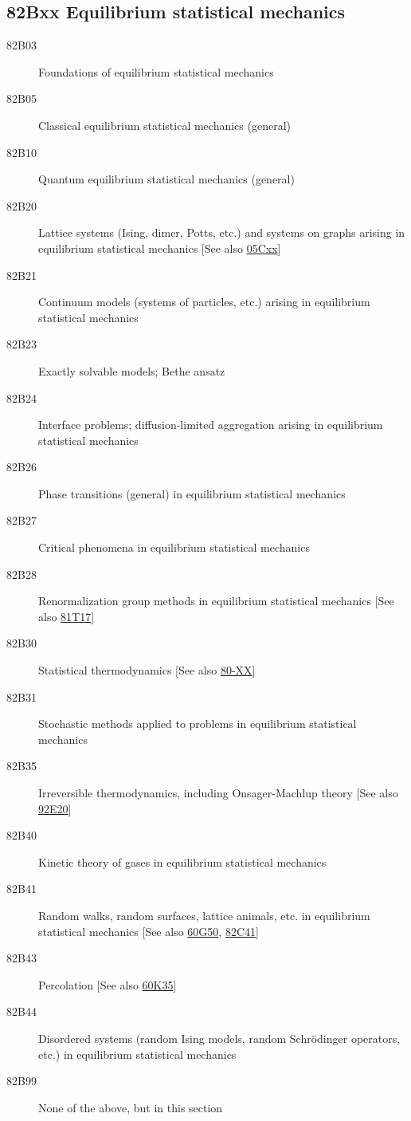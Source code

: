 \subsection*{82Bxx  Equilibrium statistical mechanics }\label{82Bxx}
\begin{description}  
\item [82B03]\label{82B03} Foundations of equilibrium statistical mechanics
\item [82B05]\label{82B05} Classical equilibrium statistical mechanics (general)
\item [82B10]\label{82B10} Quantum equilibrium statistical mechanics (general)
\item [82B20]\label{82B20} Lattice systems (Ising, dimer, Potts, etc.) and systems on graphs arising in equilibrium statistical mechanics [See also \hyperref[05Cxx]{05Cxx}]
\item [82B21]\label{82B21} Continuum models (systems of particles, etc.) arising in equilibrium statistical mechanics
\item [82B23]\label{82B23} Exactly solvable models; Bethe ansatz
\item [82B24]\label{82B24} Interface problems; diffusion-limited aggregation arising in equilibrium statistical mechanics
\item [82B26]\label{82B26} Phase transitions (general) in equilibrium statistical mechanics
\item [82B27]\label{82B27} Critical phenomena in equilibrium statistical mechanics
\item [82B28]\label{82B28} Renormalization group methods in equilibrium statistical mechanics [See also \hyperref[81T17]{81T17}]
\item [82B30]\label{82B30} Statistical thermodynamics [See also \hyperref[80-XX]{80-XX}]
\item [82B31]\label{82B31} Stochastic methods applied to problems in equilibrium statistical mechanics
\item [82B35]\label{82B35} Irreversible thermodynamics, including Onsager-Machlup theory [See also \hyperref[92E20]{92E20}]
\item [82B40]\label{82B40} Kinetic theory of gases  in equilibrium statistical mechanics
\item [82B41]\label{82B41} Random walks, random surfaces, lattice animals, etc. in equilibrium statistical mechanics [See also \hyperref[60G50]{60G50}, \hyperref[82C41]{82C41}]
\item [82B43]\label{82B43} Percolation [See also \hyperref[60K35]{60K35}]
\item [82B44]\label{82B44} Disordered systems (random Ising models, random Schr\"{o}dinger operators, etc.) in equilibrium statistical mechanics
\item [82B99]\label{82B99} None of the above, but in this section
\end{description}
